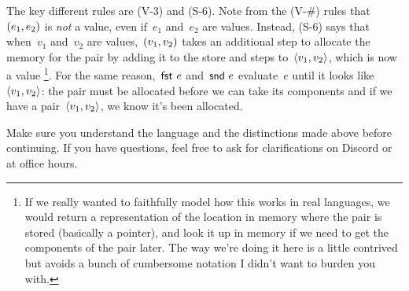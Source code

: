 \documentclass{article}
\begin{document}
The key different rules are (V-3) and (S-6).
%
Note from the (V-\#) rules that~$(e_1, e_2)$ is {\em not} a value,
even if~$e_1$ and~$e_2$ are values.
%
Instead, (S-6) says that when~$v_1$ and~$v_2$ are values,~$(v_1, v_2)$
takes an additional step to allocate the memory for the pair by adding it
to the store and steps to~$\langle v_1, v_2 \rangle$, which is now a value%
\footnote{If we really wanted to faithfully model how this works in real
  languages, we would return a representation of the location in memory where
  the pair is stored (basically a pointer), and look it up in memory if we
  need to get the components of the pair later. The way we're doing it here
  is a little contrived but avoids a bunch of cumbersome notation I didn't
  want to burden you with.}.
%
For the same reason,~$\mathsf{fst}~e$ and~$\mathsf{snd}~e$ evaluate~$e$ until
it looks like~$\langle v_1, v_2 \rangle$: the pair must be allocated before we can
take its components and if we have a pair~$\langle v_1, v_2 \rangle$, we know it's
been allocated.

Make sure you understand the language and the distinctions made above
before continuing.
%
If you have questions, feel free to ask for clarifications on Discord or
at office hours.
\end{document}
